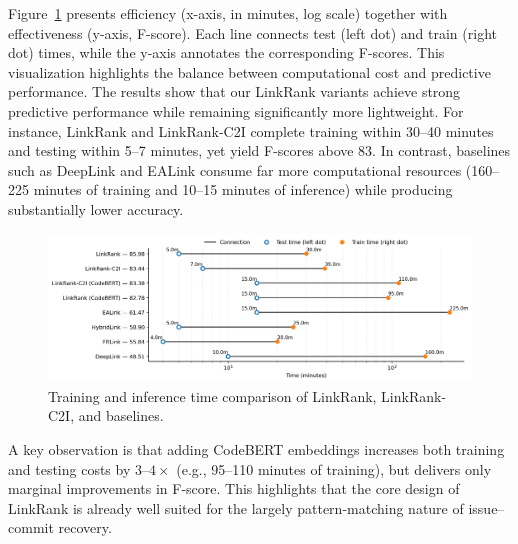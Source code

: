 Figure~\ref{fig:time} presents efficiency (x-axis, in minutes, log scale) together with effectiveness (y-axis, F-score). Each line connects test (left dot) and train (right dot) times, while the y-axis annotates the corresponding F-scores. This visualization highlights the balance between computational cost and predictive performance. The results show that our LinkRank variants achieve strong predictive performance while remaining significantly more lightweight. For instance, LinkRank and LinkRank-C2I complete training within 30--40 minutes and testing within 5--7 minutes, yet yield F-scores above 83. In contrast, baselines such as DeepLink and EALink consume far more computational resources (160--225 minutes of training and 10--15 minutes of inference) while producing substantially lower accuracy.

\begin{figure}[htbp]
	\centering
	\includegraphics[width=\linewidth]{Figures/time.png}
	\caption{Training and inference time comparison of LinkRank, LinkRank-C2I, and baselines. }
	\label{fig:time}
\end{figure}

A key observation is that adding CodeBERT embeddings increases both training and testing costs by $3$--$4\times$ (e.g., 95--110 minutes of training), but delivers only marginal improvements in F-score. This highlights that the core design of LinkRank is already well suited for the largely pattern-matching nature of issue--commit recovery.




